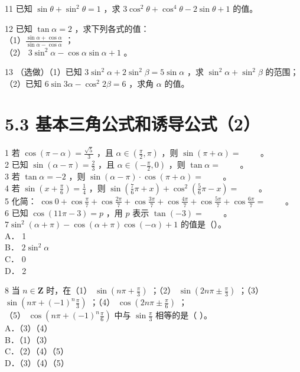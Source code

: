 \documentclass[10pt]{article}
\begin{document}
11 已知 \(\sin \theta+\sin ^{2} \theta=1\) ，求 \(3 \cos ^{2} \theta+\cos ^{4} \theta-2 \sin \theta+1\) 的值。

12 已知 \(\tan \alpha=2\) ，求下列各式的值：\\
（1）\(\frac{\sin \alpha+\cos \alpha}{\sin \alpha-\cos \alpha}\) ；\\
（2） \(3 \sin ^{2} \alpha-\cos \alpha \sin \alpha+1\) 。

13 （选做）（1）已知 \(3 \sin ^{2} \alpha+2 \sin ^{2} \beta=5 \sin \alpha\) ，求 \(\sin ^{2} \alpha+\sin ^{2} \beta\) 的范围；\\
（2）已知 \(6 \sin 3 \alpha-\cos ^{2} 2 \beta=6\) ，求角 \(\alpha\) 的值。

\section*{5.3 基本三角公式和诱导公式（2）}
1 若 \(\cos (\pi-\alpha)=\frac{\sqrt{5}}{3}\) ，且 \(\alpha \in\left(\frac{\pi}{2}, \pi\right)\) ，则 \(\sin (\pi+\alpha)=\) \(\qquad\)。\\
2 已知 \(\sin (\alpha-\pi)=\frac{2}{3}\) ，且 \(\alpha \in\left(-\frac{\pi}{2}, 0\right)\) ，则 \(\tan \alpha=\) \(\qquad\)。\\
3 若 \(\tan \alpha=-2\) ，则 \(\sin (\alpha-\pi) \cdot \cos (\pi+\alpha)=\) \(\qquad\)。\\
4 若 \(\sin \left(x+\frac{\pi}{6}\right)=\frac{1}{4}\) ，则 \(\sin \left(\frac{7}{6} \pi+x\right)+\cos ^{2}\left(\frac{5}{6} \pi-x\right)=\) \(\qquad\)。\\
5 化简： \(\cos 0+\cos \frac{\pi}{7}+\cos \frac{2 \pi}{7}+\cos \frac{3 \pi}{7}+\cos \frac{4 \pi}{7}+\cos \frac{5 \pi}{7}+\cos \frac{6 \pi}{7}=\) \(\qquad\)。\\
6 已知 \(\cos (11 \pi-3)=p\) ，用 \(p\) 表示 \(\tan (-3)=\) \(\qquad\)。\\
\(7 \sin ^{2}(\alpha+\pi)-\cos (\alpha+\pi) \cos (-\alpha)+1\) 的值是（）。\\
A． 1\\
B． \(2 \sin ^{2} \alpha\)\\
C． 0\\
D． 2

8 当 \(n \in \mathbf{Z}\) 时，在（1） \(\sin \left(n \pi+\frac{\pi}{3}\right)\) ；（2） \(\sin \left(2 n \pi \pm \frac{\pi}{3}\right)\) ；（3） \(\sin \left(n \pi+(-1)^{n} \frac{\pi}{3}\right)\) ；（4） \(\cos \left(2 n \pi \pm \frac{\pi}{6}\right)\) ；\\
（5） \(\cos \left(n \pi+(-1)^{n} \frac{\pi}{6}\right)\) 中与 \(\sin \frac{\pi}{3}\) 相等的是（ ）。\\
A．（3）（4）\\
B．（1）（3）\\
C．（2）（4）（5）\\
D．（3）（4）（5）
\end{document}
